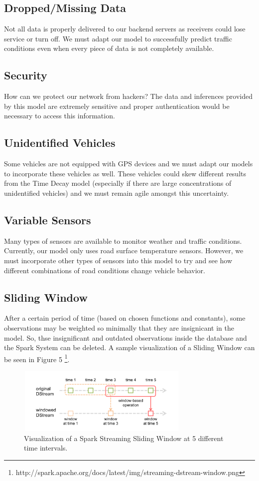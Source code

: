 \documentclass{vldb}
\begin{document}
\subsection{Dropped/Missing Data}
Not all data is properly delivered to our backend servers as receivers could lose service or turn off. We must adapt our model to successfully predict traffic conditions even when every piece of data is not completely available.

\subsection{Security}
How can we protect our network from hackers? The data and inferences provided by this model are extremely sensitive and proper authentication would be necessary to access this information. 

\subsection{Unidentified Vehicles}
Some vehicles are not equipped with GPS devices and we must adapt our models to incorporate these vehicles as well. These vehicles could skew different results from the Time Decay model (especially if there are large concentrations of unidentified vehicles) and we must remain agile amongst this uncertainty. 

\subsection{Variable Sensors}
Many types of sensors are available to monitor weather and traffic conditions. Currently, our model only uses road surface temperature sensors. However, we must incorporate other types of sensors into this model to try and see how different combinations of road conditions change vehicle behavior.

\subsection{Sliding Window}
After a certain period of time (based on chosen functions and constants), some observations may be weighted so minimally that they are insignicant in the model. So, thse insignificant and outdated observations inside the database and the Spark System can be deleted. A sample visualization of a Sliding Window can be seen in Figure 5 \footnote{http://spark.apache.org/docs/latest/img/streaming-dstream-window.png}. 

\begin{figure}
\centering
\includegraphics[width=3.25in,height=1.25in]{slidingwindow}
\caption{Visualization of a Spark Streaming Sliding Window at 5 different time intervals.}
\label{fig:dstream}
\end{figure}
\end{document}
